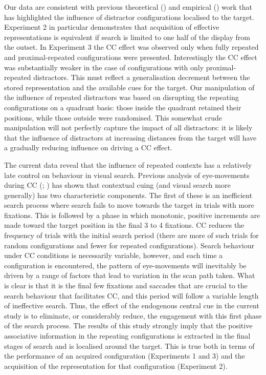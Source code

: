\documentclass[
  man,
  floatsintext,
  longtable,
  nolmodern,
  notxfonts,
  notimes,
  colorlinks=true,linkcolor=blue,citecolor=blue,urlcolor=blue]{apa7}
\begin{document}
Our data are consistent with previous theoretical
() and empirical
() work that has
highlighted the influence of distractor configurations localised to the
target. Experiment 2 in particular demonstrates that acquisition of
effective representations is equivalent if search is limited to one half
of the display from the outset. In Experiment 3 the CC effect was
observed only when fully repeated and proximal-repeated configurations
were presented. Interestingly the CC effect was substantially weaker in
the case of configurations with only proximal-repeated distractors. This
must reflect a generalisation decrement between the stored
representation and the available cues for the target. Our manipulation
of the influence of repeated distractors was based on disrupting the
repeating configurations on a quadrant basis: those inside the quadrant
retained their positions, while those outside were randomised. This
somewhat crude manipulation will not perfectly capture the impact of all
distractors: it is likely that the influence of distractors at
increasing distances from the target will have a gradually reducing
influence on driving a CC effect.

The current data reveal that the influence of repeated contexts has a
relatively late control on behaviour in visual search. Previous analysis
of eye-movements during CC (; ) has shown that
contextual cuing (and visual search more generally) has two
characteristic components. The first of these is an inefficient search
process where search fails to move towards the target in trials with
more fixations. This is followed by a phase in which monotonic, positive
increments are made toward the target position in the final 3 to 4
fixations. CC reduces the frequency of trials with the initial search
period (there are more of such trials for random configurations and
fewer for repeated configurations). Search behaviour under CC conditions
is necessarily variable, however, and each time a configuration is
encountered, the pattern of eye-movements will inevitably be driven by a
range of factors that lead to variation in the scan path taken. What is
clear is that it is the final few fixations and saccades that are
crucial to the search behaviour that facilitates CC, and this period
will follow a variable length of ineffective search. Thus, the effect of
the endogenous central cue in the current study is to eliminate, or
considerably reduce, the engagement with this first phase of the search
process. The results of this study strongly imply that the positive
associative information in the repeating configurations is extracted in
the final stages of search and is localised around the target. This is
true both in terms of the performance of an acquired configuration
(Experiments 1 and 3) and the acquisition of the representation for that
configuration (Experiment 2).
\end{document}
